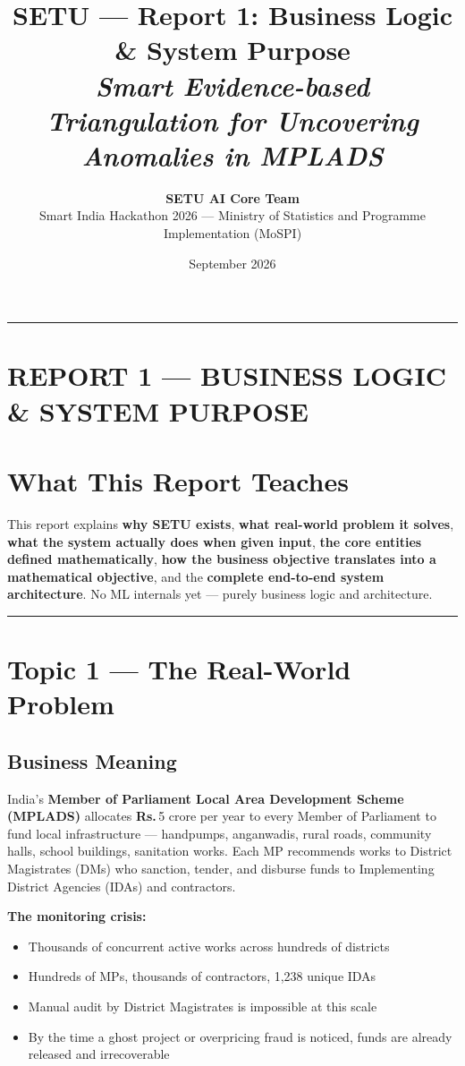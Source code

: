 \documentclass[11pt,a4paper]{article}
\title{\Large\textbf{SETU --- Report 1: Business Logic \& System Purpose}\\[0.4em]\large\textit{Smart Evidence-based Triangulation for Uncovering Anomalies in MPLADS}}
\author{\textbf{SETU AI Core Team}\\Smart India Hackathon 2026 --- Ministry of Statistics and Programme Implementation (MoSPI)}
\date{September 2026}
\DeclareRobustCommand{\INR}{\textbf{Rs.\,}}
\DeclareRobustCommand{\INR}{₹}
\begin{document}
\maketitle
\tableofcontents
\vspace{1.5em}
\hrule
\vspace{1.5em}

\clearpage
\section*{REPORT 1 --- BUSINESS LOGIC \& SYSTEM PURPOSE}

\section{What This Report Teaches}

This report explains \textbf{why SETU exists}, \textbf{what real-world problem it solves}, \textbf{what the system actually does when given input}, \textbf{the core entities defined mathematically}, \textbf{how the business objective translates into a mathematical objective}, and the \textbf{complete end-to-end system architecture}. No ML internals yet --- purely business logic and architecture.

\vspace{1em}\hrule\vspace{1em}

\section{Topic 1 --- The Real-World Problem}

\subsection{Business Meaning}

India's \textbf{Member of Parliament Local Area Development Scheme (MPLADS)} allocates \INR{}5 crore per year to every Member of Parliament to fund local infrastructure --- handpumps, anganwadis, rural roads, community halls, school buildings, sanitation works. Each MP recommends works to District Magistrates (DMs) who sanction, tender, and disburse funds to Implementing District Agencies (IDAs) and contractors.

\textbf{The monitoring crisis:}
\begin{itemize}[leftmargin=1.5em, itemsep=2pt, topsep=3pt]
\item Thousands of concurrent active works across hundreds of districts
\item Hundreds of MPs, thousands of contractors, 1,238 unique IDAs
\item Manual audit by District Magistrates is impossible at this scale
\item By the time a ghost project or overpricing fraud is noticed, funds are already released and irrecoverable
\end{itemize}
\end{document}
